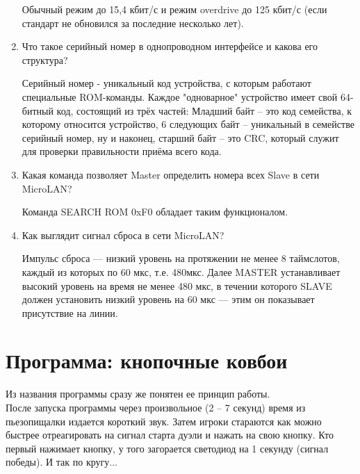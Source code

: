 \documentclass{lab}
\begin{document}
\begin{enumerate}
	Обычный режим до 15,4 кбит/с и режим overdrive до 125 кбит/с (если стандарт не обновился за последние несколько лет).
	
	\item Что такое серийный номер в однопроводном интерфейсе и какова его структура?
	
	Серийный номер - уникальный код устройства, с которым работают специальные ROM-команды. Каждое "одноварное" устройство имеет свой 64-битный код, состоящий из трёх частей:
	Младший байт – это код семейства, к которому относится устройство, 6 следующих байт – уникальный в семействе серийный номер, ну и наконец, старший байт – это CRC, который служит для проверки правильности приёма всего кода.
	\item Какая команда позволяет Master определить номера всех Slave в сети MicroLAN?
	
	Команда SEARCH ROM 0xF0 обладает таким функционалом.
	\item Как выглядит сигнал сброса в сети MicroLAN?
	
	Импульс сброса — низкий уровень на протяжении не менее 8 таймслотов, каждый из которых по 60 мкс, т.е. 480мкс. Далее MASTER устанавливает высокий уровень на время не менее 480 мкс, в течении которого SLAVE должен установить низкий уровень на 60 мкс — этим он показывает присутствие на линии.
	
	
	
\end{enumerate}

\newpage

\section*{Программа: кнопочные ковбои}

Из названия программы сразу же понятен ее принцип работы.\\

После запуска программы через произвольное (2 -- 7 секунд) время из пьезопищалки издается короткий звук. Затем игроки стараются как можно быстрее отреагировать на сигнал старта дуэли и нажать на свою кнопку. Кто первый нажимает кнопку, у того загорается светодиод на 1 секунду (сигнал победы). И так по кругу...
\end{document}
